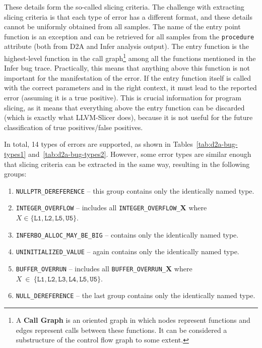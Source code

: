 These details form the so-called slicing criteria. The challenge with extracting slicing criteria is that each type of error has a different format, and these details cannot be uniformly obtained from all samples. The name of the entry point function is an exception and can be retrieved for all samples from the \texttt{procedure} attribute (both from D2A and Infer analysis output). The entry function is the highest-level function in the call graph\footnote{A \textbf{Call Graph} is an oriented graph in which nodes represent functions and edges represent calls between these functions. It can be considered a substructure of the control flow graph to some extent.} among all the functions mentioned in the Infer bug trace. Practically, this means that anything above this function is not important for the manifestation of the error. If the entry function itself is called with the correct parameters and in the right context, it must lead to the reported error (assuming it is a true positive). This is crucial information for program slicing, as it means that everything above the entry function can be discarded (which is exactly what LLVM-Slicer does), because it is not useful for the future classification of true positives/false positives.

In total, 14 types of errors are supported, as shown in Tables~\ref{tab:d2a-bug-types1} and~\ref{tab:d2a-bug-types2}. However, some error types are similar enough that slicing criteria can be extracted in the same way, resulting in the following groups:
\begin{enumerate}
    \item \texttt{NULLPTR\_DEREFERENCE} -- this group contains only the identically named type.
    \item \texttt{INTEGER\_OVERFLOW} -- includes all \texttt{INTEGER\_OVERFLOW\_}\textbf{X} where $X \in \{\texttt{L1}, \texttt{L2}, \texttt{L5}, \texttt{U5}\}$.
    \item \texttt{INFERBO\_ALLOC\_MAY\_BE\_BIG} -- contains only the identically named type.
    \item \texttt{UNINITIALIZED\_VALUE} -- again contains only the identically named type.
    \item \texttt{BUFFER\_OVERRUN} -- includes all \texttt{BUFFER\_OVERRUN\_}\textbf{X} where 
    \newline
    $X~\in~\{\texttt{L1}, \texttt{L2}, \texttt{L3}, \texttt{L4}, \texttt{L5}, \texttt{U5}\}$.
    \item \texttt{NULL\_DEREFERENCE} -- the last group contains only the identically named type.
\end{enumerate}

